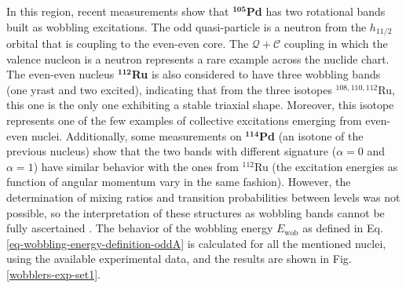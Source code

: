 In this region, recent measurements show that $^\mathbf{105}$\textbf{Pd} \cite{timar2019experimental} has two rotational bands built as wobbling excitations. The odd quasi-particle is a neutron from the $h_{11/2}$ orbital that is coupling to the even-even core. The $\mathcal{Q}+\mathscr{C}$ coupling in which the valence nucleon is a neutron represents a rare example across the nuclide chart. The even-even nucleus $^\mathbf{112}$\textbf{Ru} \cite{hamilton2010super} is also considered to have three wobbling bands (one yrast and two excited), indicating that from the three isotopes $^{108,110,112}$Ru, this one is the only one exhibiting a stable triaxial shape. Moreover, this isotope represents one of the few examples of collective excitations emerging from even-even nuclei. Additionally, some measurements on $^\mathbf{114}$\textbf{Pd} \cite{luo2013triaxial} (an isotone of the previous nucleus) show that the two bands with different signature ($\alpha=0$ and $\alpha=1$) have similar behavior with the ones from $^{112}$Ru (the excitation energies as function of angular momentum vary in the same fashion). However, the determination of mixing ratios and transition probabilities between levels was not possible, so the interpretation of these structures as wobbling bands cannot be fully ascertained \cite{lv2022experimental}. The behavior of the wobbling energy $E_\text{wob}$ as defined in Eq. \ref{eq-wobbling-energy-definition-oddA} is calculated for all the mentioned nuclei, using the available experimental data, and the results are shown in Fig. \ref{wobblers-exp-set1}.
